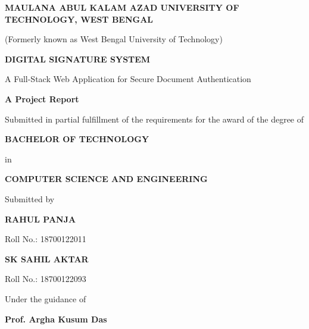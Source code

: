 \begin{titlepage}
    \centering
    \vspace*{1cm}

    {\LARGE\bfseries MAULANA ABUL KALAM AZAD UNIVERSITY OF TECHNOLOGY, WEST BENGAL\par}
    \vspace{0.4cm}
    {\large (Formerly known as West Bengal University of Technology)\par}

    \vspace{1.5cm}

    {\huge\bfseries DIGITAL SIGNATURE SYSTEM\par}
    \vspace{0.5cm}
    {\Large A Full-Stack Web Application for Secure Document Authentication\par}

    \vspace{1.5cm}

    {\large\bfseries A Project Report\par}
    \vspace{0.4cm}
    {\normalsize Submitted in partial fulfillment of the requirements for the award of the degree of\par}
    \vspace{0.3cm}
    {\Large\bfseries BACHELOR OF TECHNOLOGY\par}
    \vspace{0.3cm}
    {\normalsize in\par}
    \vspace{0.3cm}
    {\Large\bfseries COMPUTER SCIENCE AND ENGINEERING\par}

    \vspace{1.5cm}

    {\normalsize Submitted by\par}
    \vspace{0.5cm}
    {\large\bfseries RAHUL PANJA\par}
    {\normalsize Roll No.: 18700122011\par}
    \vspace{0.4cm}
    {\large\bfseries SK SAHIL AKTAR\par}
    {\normalsize Roll No.: 18700122093\par}

    \vspace{1.2cm}

    {\normalsize Under the guidance of\par}
    \vspace{0.4cm}
    {\large\bfseries Prof. Argha Kusum Das\par}


\end{titlepage}
